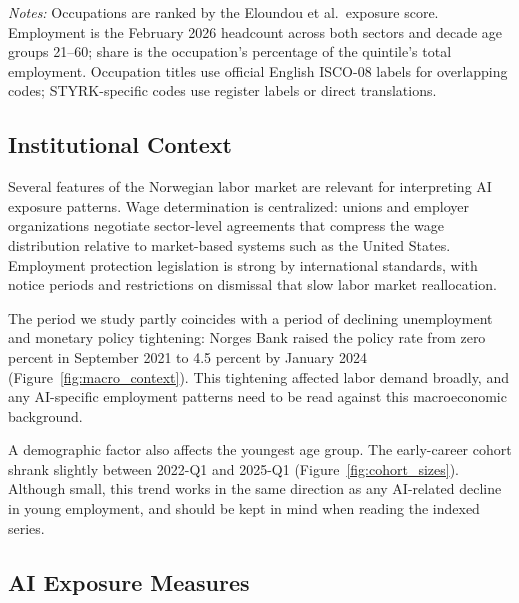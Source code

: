 \documentclass[12pt]{article}
\begin{document}
\begin{table}[htbp]
\centering
\caption{Five largest occupations by AI-exposure quintile, February 2026.}
\label{tab:quintile_top_occ}
\footnotesize

\begin{minipage}{\textwidth}\footnotesize\textit{Notes:} Occupations are ranked by the Eloundou et al.\ exposure score. Employment is the February 2026 headcount across both sectors and decade age groups 21--60; share is the occupation's percentage of the quintile's total employment. Occupation titles use official English ISCO-08 labels for overlapping codes; STYRK-specific codes use register labels or direct translations.\end{minipage}
\end{table}


\subsection{Institutional Context}\label{sec:data:institutions}

Several features of the Norwegian labor market are relevant for interpreting AI exposure patterns. Wage determination is centralized: unions and employer organizations negotiate sector-level agreements that compress the wage distribution relative to market-based systems such as the United States. Employment protection legislation is strong by international standards, with notice periods and restrictions on dismissal that slow labor market reallocation.

The period we study partly coincides with a period of declining unemployment and monetary policy tightening: Norges Bank raised the policy rate from zero percent in September 2021 to 4.5 percent by January 2024 (Figure~\ref{fig:macro_context}). This tightening affected labor demand broadly, and any AI-specific employment patterns need to be read against this macroeconomic background.

A demographic factor also affects the youngest age group. The early-career cohort shrank slightly between 2022-Q1 and 2025-Q1 (Figure~\ref{fig:cohort_sizes}). Although small, this trend works in the same direction as any AI-related decline in young employment, and should be kept in mind when reading the indexed series.


\subsection{AI Exposure Measures}\label{sec:data:ai}
\end{document}
